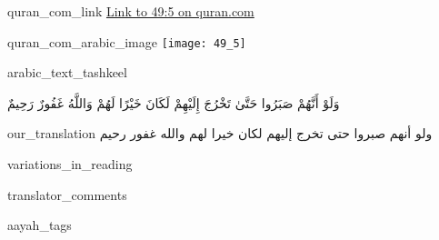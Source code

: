 \begin{comment}
The following strings are to be replaced by a script, in order to use this file as a template (all upper case):-
* sN = sūrah number, without leading zeros
* aYN = āyah number, without leading zeros
* aRABIC_TEXT_TASHKEEL = the text of the aayah, with tashkeel marks
* aRABIC_TEXT_WITHOUT_TASHKEEL = the text of the aayah, without tashkeel marks
* tAFSEER_SADI_ARABIC = the tafseer of the aayah from as-sa'di
\end{comment}
\begin{comment}
The following tags are declared here:-
quran_com_link
quran_com_arabic_image
arabic_text_tashkeel
our_translation
variations_in_reading
translator_comments
aayah_tags
tafseer_sadi_arabic
tafseer_sadi_translation
license_comment_aayah
\end{comment}
\begin{taggedblock}{quran_com_link}
\href{http://quran.com/49/5}{Link to 49:5 on quran.com}
\end{taggedblock}
\begin{taggedblock}{quran_com_arabic_image}
\texttt{[image: 49\_5]}
\end{taggedblock}
\begin{taggedblock}{arabic_text_tashkeel}
\begin{Arabic}
وَلَوْ أَنَّهُمْ صَبَرُوا حَتَّىٰ تَخْرُجَ إِلَيْهِمْ لَكَانَ خَيْرًا لَهُمْ وَاللَّهُ غَفُورٌ رَحِيمٌ
\end{Arabic}
\end{taggedblock}
\begin{taggedblock}{our_translation}
ولو أنهم صبروا حتى تخرج إليهم لكان خيرا لهم والله غفور رحيم
\end{taggedblock}
\begin{taggedblock}{variations_in_reading}
\end{taggedblock}
\begin{taggedblock}{translator_comments}
\end{taggedblock}
\begin{taggedblock}{aayah_tags}
\end{taggedblock}
